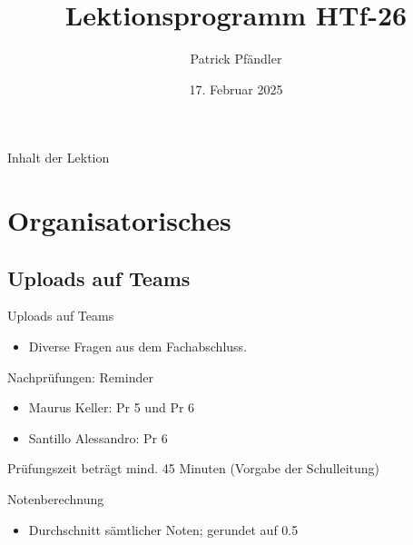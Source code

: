 \def\customoptions{aspectratio=169} %



\title{\textbf{Lektionsprogramm HTf-26}}
\author{Patrick Pfändler}
\date{17. Februar 2025}




\frame{\titlepage}

\begin{frame}{Inhalt der Lektion}
    \tableofcontents
\end{frame}

\folieFragen


\section{Organisatorisches}
\BlueSectionSlide

\subsection{Uploads auf Teams}
\begin{frame}{Uploads auf Teams}
    \begin{itemize}
        \item[\textbullet] Diverse Fragen aus dem Fachabschluss.
    \end{itemize}
\end{frame}



\begin{frame}{Nachprüfungen: Reminder}
    \begin{itemize}
        \item Maurus Keller: Pr 5 und Pr 6 
        \item Santillo	Alessandro: Pr 6
    \end{itemize}

    \vspace{\baselineskip}
    Prüfungszeit beträgt mind. 45 Minuten (Vorgabe der Schulleitung)

\end{frame}


\begin{frame}{Notenberechnung}

    \begin{itemize}
        \item[\textbullet] Durchschnitt sämtlicher Noten; gerundet auf 0.5
    \end{itemize}

\end{frame}

